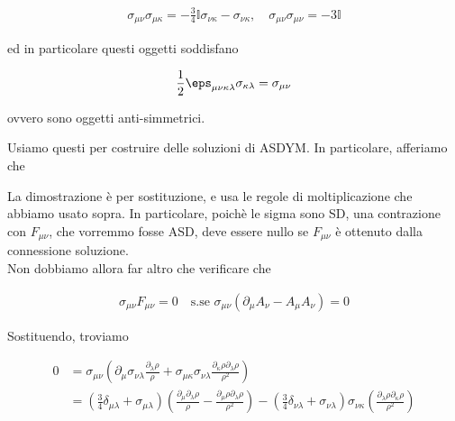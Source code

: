 \documentclass{report}
\begin{document}
\begin{align}
    \sigma_{\mu\nu}\sigma_{\mu\kappa} = -\frac{3}{4}\mathbb{I}\sigma_{\nu\kappa} - \sigma_{\nu\kappa}, \quad \sigma_{\mu\nu}\sigma_{\mu\nu} = -3\mathbb{I}
\end{align}

ed in particolare questi oggetti soddisfano 

\begin{align}
    \frac{1}{2}\eps_{\mu\nu\kappa\lambda}\sigma_{\kappa\lambda} = \sigma_{\mu\nu}
\end{align}

ovvero sono oggetti anti-simmetrici. 

Usiamo questi per costruire delle soluzioni di ASDYM. In particolare, afferiamo che 


La dimostrazione è per sostituzione, e usa le regole di moltiplicazione che abbiamo usato sopra. In particolare, poichè le sigma sono SD, una contrazione con \(F_{\mu\nu}\), che vorremmo fosse ASD, deve essere nullo se \(F_{\mu\nu}\) è ottenuto dalla connessione soluzione. \\

Non dobbiamo allora far altro che verificare che 

\begin{align}
    \sigma_{\mu\nu}F_{\mu\nu} = 0 \quad \text{s.se} \, \,   \sigma_{\mu\nu}(\partial_\mu A_\nu - A_{\mu}A_\nu)  = 0 
\end{align}

Sostituendo, troviamo 

\begin{align}
    0 &= \sigma_{\mu\nu}\left(\partial_{\mu}\sigma_{\nu\lambda}\frac{\partial_\lambda\rho}{\rho} + \sigma_{\mu\kappa}\sigma_{\nu\lambda} \frac{\partial_\kappa \rho \partial_\lambda \rho}{\rho^2}\right) \\
    &= \left(\frac{3}{4}\delta_{\mu\lambda} + \sigma_{\mu\lambda}\right)\left(\frac{\partial_\mu \partial_\lambda \rho}{\rho} - \frac{\partial_\mu\rho \partial_\lambda \rho}{\rho^2} \right) - \left(\frac{3}{4}\delta_{\nu\lambda} + \sigma_{\nu\lambda}\right) \sigma_{\nu\kappa}\left(\frac{\partial_\lambda \rho \partial_\kappa \rho}{\rho^2}\right) 
\end{align}
\end{document}
